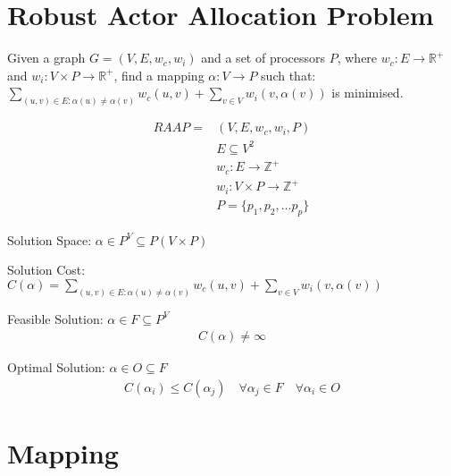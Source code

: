 \documentclass{article}
\begin{document}
\section{Robust Actor Allocation Problem}

\begin{definition}
Given a graph $G=(V,E,w_c,w_i)$ and a set of processors $P$, where $w_c : E \rightarrow \mathbb{R}^+$ and $w_i : V \times P \rightarrow \mathbb{R}^+$, find a mapping $\alpha : V \rightarrow P$ such that:
$\displaystyle\sum\limits_{(u,v) \in E : \alpha(u) \neq \alpha(v)} w_c(u,v) + \displaystyle\sum\limits_{v \in V} w_i(v, \alpha(v))$ is minimised.

\begin{align}
	\nonumber RAAP = & (V,E,w_c, w_i, P)\\
	\nonumber & E \subseteq V^2\\
	\nonumber & w_c : E \rightarrow \mathbb{Z}^+\\
	\nonumber & w_i : V \times P \rightarrow \mathbb{Z}^+\\
	\nonumber & P = \{p_1, p_2, ...p_p\}
\end{align}

Solution Space: $\alpha \in P^V \subseteq P(V \times P)$

Solution Cost: $C(\alpha) = \displaystyle\sum\limits_{(u,v) \in E : \alpha(u) \neq \alpha(v)} w_c(u,v) + \displaystyle\sum\limits_{v \in V} w_i(v, \alpha(v))$

Feasible Solution: $\alpha \in F \subseteq P^V$
\begin{align}
	\nonumber C(\alpha) \neq \infty
\end{align}

Optimal Solution: $\alpha \in O \subseteq F$
\begin{align}
	\nonumber 	C(\alpha_i) \leq C(\alpha_j) \quad \forall \alpha_j \in F \quad \forall \alpha_i \in O
\end{align}

\end{definition}

\section{Mapping}
\end{document}
